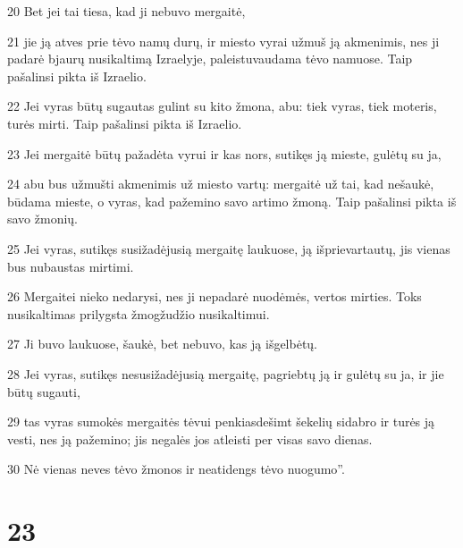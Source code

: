 \par 20 Bet jei tai tiesa, kad ji nebuvo mergaitė, 
\par 21 jie ją atves prie tėvo namų durų, ir miesto vyrai užmuš ją akmenimis, nes ji padarė bjaurų nusikaltimą Izraelyje, paleistuvaudama tėvo namuose. Taip pašalinsi pikta iš Izraelio. 
\par 22 Jei vyras būtų sugautas gulint su kito žmona, abu: tiek vyras, tiek moteris, turės mirti. Taip pašalinsi pikta iš Izraelio. 
\par 23 Jei mergaitė būtų pažadėta vyrui ir kas nors, sutikęs ją mieste, gulėtų su ja, 
\par 24 abu bus užmušti akmenimis už miesto vartų: mergaitė už tai, kad nešaukė, būdama mieste, o vyras, kad pažemino savo artimo žmoną. Taip pašalinsi pikta iš savo žmonių. 
\par 25 Jei vyras, sutikęs susižadėjusią mergaitę laukuose, ją išprievartautų, jis vienas bus nubaustas mirtimi. 
\par 26 Mergaitei nieko nedarysi, nes ji nepadarė nuodėmės, vertos mirties. Toks nusikaltimas prilygsta žmogžudžio nusikaltimui. 
\par 27 Ji buvo laukuose, šaukė, bet nebuvo, kas ją išgelbėtų. 
\par 28 Jei vyras, sutikęs nesusižadėjusią mergaitę, pagriebtų ją ir gulėtų su ja, ir jie būtų sugauti, 
\par 29 tas vyras sumokės mergaitės tėvui penkiasdešimt šekelių sidabro ir turės ją vesti, nes ją pažemino; jis negalės jos atleisti per visas savo dienas. 
\par 30 Nė vienas neves tėvo žmonos ir neatidengs tėvo nuogumo”.



\chapter{23}


